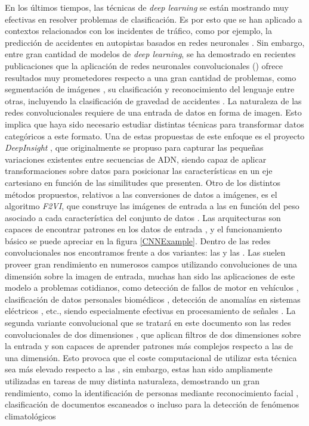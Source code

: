 En los últimos tiempos, las técnicas de \textit{deep learning} se están mostrando muy efectivas en resolver problemas de clasificación. Es por esto que se han aplicado a contextos relacionados con los incidentes de tráfico, como por ejemplo, la predicción de accidentes en autopistas basados en redes neuronales \cite{RedNeuronalAutopistaAccidentes}. Sin embargo, entre gran cantidad de modelos de \textit{deep learning}, se ha demostrado en recientes publicaciones que la aplicación de redes neuronales convolucionales () ofrece resultados muy prometedores respecto a una gran cantidad de problemas, como segmentación de imágenes \cite{ImageSegmentationCNNEA}, su clasificación \cite{ImageClassificationCNNEA} y reconocimiento del lenguaje \cite{LanguageRecognitionCNNEA} entre otras, incluyendo la clasificación de gravedad de accidentes \cite{OtraPrediccionConCNNs}. La naturaleza de las redes convolucionales requiere de una entrada de datos en forma de imagen. Esto implica que haya sido necesario estudiar distintas técnicas para transformar datos categóricos a este formato. Una de estas propuestas de este enfoque es el proyecto \textit{DeepInsight} \cite{DeepInsight}, que originalmente se propuso para capturar las pequeñas variaciones existentes entre secuencias de ADN, siendo capaz de aplicar transformaciones sobre datos para posicionar las características en un eje cartesiano en función de las similitudes que presenten. Otro de los distintos métodos propuestos, relativos a las conversiones de datos a imágenes, es el algoritmo \textit{F2VI}, que construye las imágenes de entrada a las  en función del peso asociado a cada característica del conjunto de datos \cite{TASPCNN}. Las arquitecturas  son capaces de encontrar patrones en los datos de entrada \cite{CNNReviews}, y el funcionamiento básico se puede apreciar en la figura \eqref{CNNExample}. Dentro de las redes convolucionales nos encontramos frente a dos variantes: las  y las . Las  suelen proveer gran rendimiento en numerosos campos utilizando convoluciones de una dimensión sobre la imagen de entrada, muchas han sido las aplicaciones de este modelo a problemas cotidianos, como detección de fallos de motor en vehículos \cite{MotorFailureCNN1D}, clasificación de datos personales biomédicos \cite{CNN1DMedicalSignalEA}, detección de anomalías en sistemas eléctricos \cite{ElectricSystemFailureCNN1D}, etc., siendo especialmente efectivas en procesamiento de señales \cite{Conv1D_Survey}. La segunda variante convolucional que se tratará en este documento son las redes convolucionales de dos dimensiones , que aplican filtros de dos dimensiones sobre la entrada y son capaces de aprender patrones más complejos respecto a las de una dimensión. Esto provoca que el coste computacional de utilizar esta técnica sea más elevado respecto a las , sin embargo, estas han sido ampliamente utilizadas en tareas de muy distinta naturaleza, demostrando un gran rendimiento, como la identificación de personas mediante reconocimiento facial \cite{FaceRecognitionCNN2EA}, clasificación de documentos escaneados \cite{DocumentAnalysisCNN2DEA} o incluso para la detección de fenómenos climatológicos 